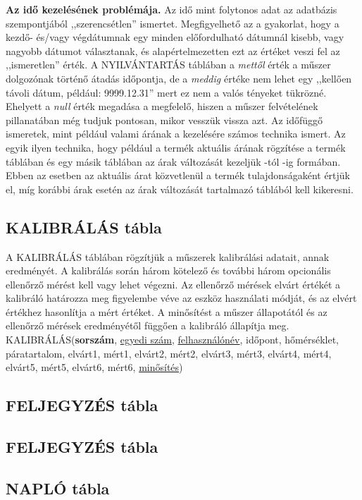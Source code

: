 \documentclass[a4paper,12pt]{report}
\newcommand{\pk}[1]{\textbf{#1}} %
\newcommand{\fk}[1]{\underline{#1}} %
\newcommand{\tabla}[1]{\noindent\MakeUppercase{#1}} %
\begin{document}
\begin{minipage}[t]{\linewidth}
\textsf{
		{\footnotesize \textbf{Az idő kezelésének problémája.}
	Az idő mint folytonos adat az adatbázis szempontjából ,,szerencsétlen'' ismertet. 
	Meg\-fi\-gyel\-he\-tő az a gyakorlat, hogy a kezdő- és/vagy végdátumnak egy minden előfordulható dátumnál kisebb, vagy nagyobb dátumot választanak, és alapértelmezetten ezt az értéket veszi fel az ,,ismeretlen'' érték.
	A \tabla{nyilvántartás} táblában a \textit{mettől} érték a műszer dolgozónak történő átadás időpontja, de a \textit{meddig} értéke nem lehet egy ,,kellően távoli dátum, például: 9999.12.31'' mert ez nem a valós tényeket tükrözné. Ehelyett a \textit{null} érték megadása a megfelelő, hiszen a műszer felvételének pillanatában még tudjuk pontosan, mikor vesszük vissza azt.
	Az időfüggő ismeretek, mint például valami árának a kezelésére számos technika ismert. Az egyik ilyen technika, hogy például a termék aktuális árának rögzítése a termék táblában és egy másik táblában az árak változását kezeljük -tól -ig formában. Ebben az esetben az aktuális árat közvetlenül a termék tulajdonságaként értjük el, míg korábbi árak esetén az árak változását tartalmazó táblából kell kikeresni.
	}
}
\end{minipage}

\subsection{KALIBRÁLÁS tábla}
A \tabla{kalibrálás} táblában rögzítjük a műszerek kalibrálási adatait, annak eredményét. A kalibrálás során három kötelező és további három opcionális ellenőrző mérést kell vagy lehet végezni. Az ellenőrző mérések elvárt értékét a kalibráló határozza meg figyelembe véve az eszköz használati módját, és az elvért értékhez hasonlítja a mért értéket. A minősítést a műszer állapotától és az ellenőrző mérések eredményétől függően a kalibráló állapítja meg.
\\

\tabla{kalibrálás}(\pk{sorszám}, \fk{egyedi szám}, \fk{felhasználónév}, időpont, hőmérséklet, páratartalom, elvárt1, mért1, elvárt2, mért2, elvárt3, mért3, elvárt4, mért4, elvárt5, mért5, elvárt6, mért6, \fk{minősítés})\\



\subsection{FELJEGYZÉS tábla}

\subsection{FELJEGYZÉS tábla}

\subsection{NAPLÓ tábla}

%
% 
\end{document}
